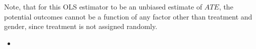 \documentclass{article}
\newcommand{\E}[0]{\mathbb{E}}
\begin{document}
\begin{itemize}
Note, that for this OLS estimator to be an unbiased estimate of $ATE$,
the potential outcomes cannot be a function of any factor other than
treatment and gender, since treatment is not assigned randomly.






\begin{itemize}
\item[] 
\end{itemize}


\end{itemize}
\end{document}
